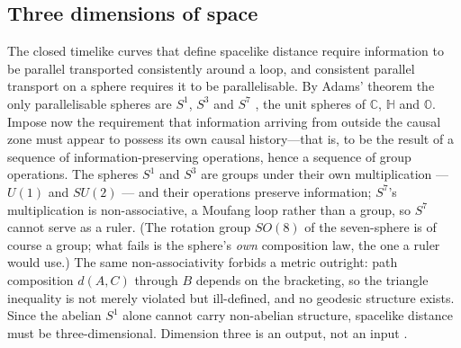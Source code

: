 \subsection{Three dimensions of space}
\label{sec:three-dimensions}

The closed timelike curves that define spacelike distance require information to
be parallel transported consistently around a loop, and consistent parallel
transport on a sphere requires it to be parallelisable. By Adams' theorem the
only parallelisable spheres are $S^{1}$, $S^{3}$ and $S^{7}$
\autocite{adams1960hopf}, the unit spheres of $\mathbb{C}$, $\mathbb{H}$ and
$\mathbb{O}$. Impose now the requirement that information arriving from outside
the causal zone must appear to possess its own causal history---that is, to be the
result of a sequence of information-preserving operations, hence a sequence of
group operations. The spheres $S^{1}$ and $S^{3}$ are groups under their own multiplication --- $U(1)$ and
$SU(2)$ --- and their operations preserve information; $S^{7}$'s multiplication is non-associative,
a Moufang loop rather than a group, so $S^{7}$ cannot serve as a ruler. (The rotation group
$SO(8)$ of the seven-sphere is of course a group; what fails is the sphere's \emph{own}
composition law, the one a ruler would use.) The same non-associativity
forbids a metric outright: path composition $d(A,C)$ through $B$ depends on the
bracketing, so the triangle inequality is not merely violated but ill-defined, and
no geodesic structure exists. Since the abelian $S^{1}$ alone cannot carry
non-abelian structure, spacelike distance must be three-dimensional. Dimension
three is an output, not an input \autocite{small_2006}.

